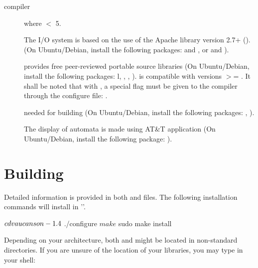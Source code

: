 \begin{description}
\item[\Cpp compiler]  where  $<$ 5.

\item[\XML] The \XML I/O system is based on the use of the Apache 
  \Cpp library version 2.7+ (). (On
  Ubuntu/Debian, install the following packages:  and
  , or  and ).
%

\item[]  provides free peer-reviewed 
portable \Cpp source
  libraries (On Ubuntu/Debian, install the following packages:
  l, , ,
  ).
  \vcsn is compatible with  versions $>$= . It shall be
  noted that with , a special flag must be given to the
  compiler through the configure file:
  .
%
  
\item[] needed for building \tafkit  (On Ubuntu/Debian, install
  the following packages: , ).
%

\item[] The display of automata is made using AT\&T 
  application (On Ubuntu/Debian, install the following package: ).
%
  
\end{description}

\section{Building \vcsn}
\label{sec:bui-ld}%


Detailed information is provided in both  and 
files. The following installation commands will install \vcsn in
''.

\begin{shell}
$ cd vaucanson-1.4
$ ./configure
$ make
$ sudo make install
\end{shell}%


Depending on your architecture, both  and  might be located
in non-standard directories. If you are unsure of the location of your
libraries, you may type in your shell:

